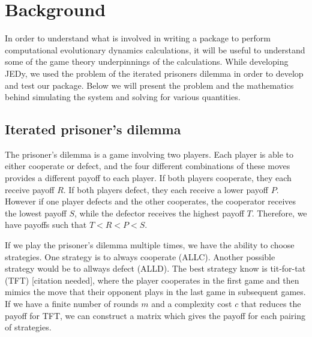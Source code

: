\section{Background}

In order to understand what is involved in writing a package to perform computational evolutionary dynamics calculations, it will be useful to understand some of the game theory underpinnings of the calculations.
While developing JEDy, we used the problem of the iterated prisoners dilemma in order to develop and test our package.
Below we will present the problem and the mathematics behind simulating the system and solving for various quantities.

\subsection{Iterated prisoner's dilemma}

The prisoner's dilemma is a game involving two players.
Each player is able to either cooperate or defect, and the four different combinations of these moves provides a different payoff to each player.
If both players cooperate, they each receive payoff $R$.
If both players defect, they each receive a lower payoff $P$.
However if one player defects and the other cooperates, the cooperator receives the lowest payoff $S$, while the defector receives the highest payoff $T$.
Therefore, we have payoffs such that $T < R < P < S$.

If we play the prisoner's dilemma multiple times, we have the ability to choose strategies.
One strategy is to always cooperate (ALLC).
Another possible strategy would be to allways defect (ALLD).
The best strategy know is tit-for-tat (TFT) [citation needed], where the player cooperates in the first game and then mimics the move that their opponent plays in the last game in subsequent games.
If we have a finite number of rounds $m$ and a complexity cost $c$ that reduces the payoff for TFT, we can construct a matrix which gives the payoff for each pairing of strategies.
